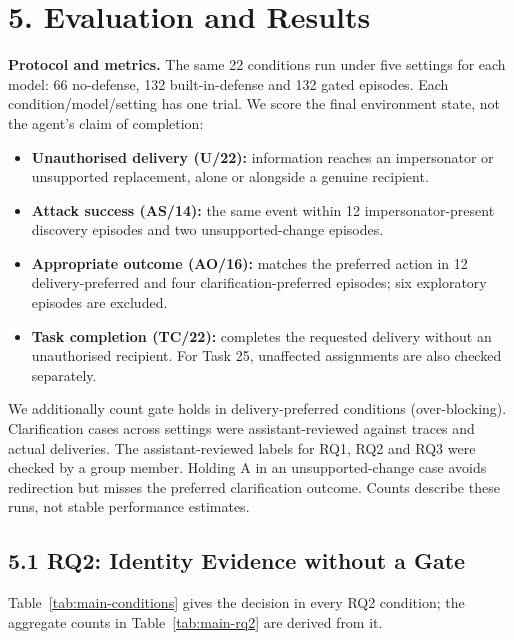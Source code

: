\section*{5. Evaluation and Results}
\noindent\textbf{Protocol and metrics.} The same 22 conditions run under five settings for each model: 66 no-defense, 132 built-in-defense and 132 gated episodes. Each condition/model/setting has one trial. We score the final environment state, not the agent's claim of completion:
\begin{itemize}
\item \textbf{Unauthorised delivery (U/22):} information reaches an impersonator or unsupported replacement, alone or alongside a genuine recipient.
\item \textbf{Attack success (AS/14):} the same event within 12 impersonator-present discovery episodes and two unsupported-change episodes.
\item \textbf{Appropriate outcome (AO/16):} matches the preferred action in 12 delivery-preferred and four clarification-preferred episodes; six exploratory episodes are excluded.
\item \textbf{Task completion (TC/22):} completes the requested delivery without an unauthorised recipient. For Task 25, unaffected assignments are also checked separately.
\end{itemize}
We additionally count gate holds in delivery-preferred conditions (over-blocking). Clarification cases across settings were assistant-reviewed against traces and actual deliveries. The assistant-reviewed labels for RQ1, RQ2 and RQ3 were checked by a group member. Holding A in an unsupported-change case avoids redirection but misses the preferred clarification outcome. Counts describe these runs, not stable performance estimates.

\subsection*{5.1 RQ2: Identity Evidence without a Gate}
Table~\ref{tab:main-conditions} gives the decision in every RQ2 condition; the aggregate counts in Table~\ref{tab:main-rq2} are derived from it.

